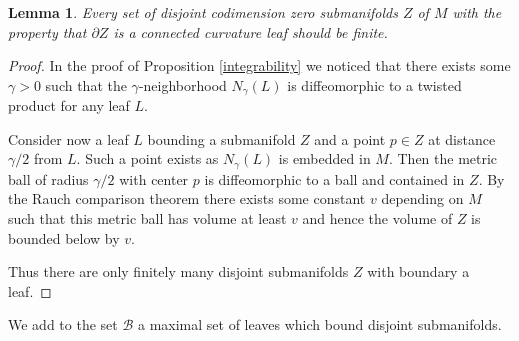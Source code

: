 \documentclass[JEP,XML,SOM,Unicode]{cedram}
\let\mathcal\mathscr
\newtheorem{lemma}[theorem]{Lemma}
\theoremstyle{definition}
\theoremstyle{remark}
\numberwithin{equation}{section}
\begin{document}
\begin{lemma}
Every set of disjoint codimension zero submanifolds $Z$ of $M$ with the property that
$\partial Z$ is a connected curvature leaf should be finite.
\end{lemma}
\begin{proof}
In the proof of Proposition \ref{integrability} we noticed that there exists some $\gamma >0$
such that the $\gamma$-neighborhood $N_{\gamma}(L)$ is diffeomorphic to a twisted product for any
leaf $L$.

Consider now a leaf $L$ bounding a submanifold $Z$ and a point $p\in Z$ at distance~$\gamma/2$ from $L$.
Such a point exists as $N_{\gamma}(L)$ is embedded in $M$.
Then the metric ball of radius $\gamma/2$ with center $p$ is diffeomorphic to a ball and contained in
$Z$. By the Rauch comparison theorem there exists some constant $v$ depending on $M$ such that
this metric ball has volume at least $v$ and hence the volume of $Z$ is bounded below by $v$.

Thus there are only finitely many disjoint submanifolds $Z$ with boundary a leaf.
\end{proof}

We add to the set $\mathcal B$ a maximal set of leaves which bound disjoint submanifolds.
\end{document}
